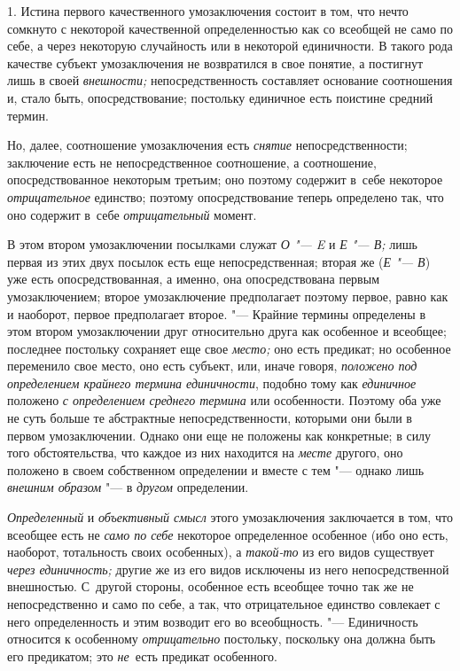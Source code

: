 1. Истина первого качественного умозаключения состоит в том,
что нечто сомкнуто с некоторой качественной определенностью как со всеобщей
не само по себе, а через некоторую случайность или в некоторой единичности.
В такого рода качестве субъект умозаключения не возвратился в свое понятие,
а постигнут лишь в своей {\em внешности;}
непосредственность составляет основание соотношения и, стало
быть, опосредствование; постольку единичное есть поистине средний термин.

Но, далее, соотношение умозаключения есть {\em снятие}
непосредственности; заключение есть не непосредственное
соотношение, а соотношение, опосредствованное некоторым третьим; оно
поэтому содержит в~себе некоторое {\em отрицательное}
единство; поэтому опосредствование теперь определено так, что
оно содержит в~себе {\em отрицательный} момент.

В этом втором умозаключении посылками служат {\em О "--- E} и {\em Е "--- В;}
лишь первая из этих двух посылок есть еще непосредственная; вторая же
({\em Е "--- В}) уже есть опосредствованная, а именно, она опосредствована
первым умозаключением; второе умозаключение предполагает поэтому первое,
равно как и наоборот, первое предполагает второе. "--- Крайние
термины определены в этом втором умозаключении друг относительно друга как
особенное и всеобщее; последнее постольку сохраняет еще свое {\em место;}
оно есть предикат; но особенное переменило свое место, оно есть субъект,
или, иначе говоря, {\em положено под определением
крайнего термина единичности}, подобно тому как
{\em единичное} положено {\em с определением среднего термина}
или особенности. Поэтому оба уже не суть больше те
абстрактные непосредственности, которыми они были в первом умозаключении.
Однако они еще не положены как конкретные; в силу того обстоятельства, что
каждое из них находится на {\em месте} другого, оно положено в своем
собственном определении и вместе с тем "--- однако лишь
{\em внешним образом} "--- в {\em другом} определении.

{\em Определенный} и {\em объективный смысл}
этого умозаключения заключается в том, что всеобщее есть не
{\em само по себе} некоторое определенное особенное (ибо оно есть, наоборот,
тотальность своих особенных), а {\em такой-то} из его видов существует
{\em через единичность;} другие же из его видов исключены из него
непосредственной внешностью. С~другой стороны, особенное есть всеобщее
точно так же не непосредственно и само по себе, а так, что отрицательное
единство совлекает с него определенность и этим возводит его во
всеобщность. "--- Единичность относится к особенному {\em отрицательно}
постольку, поскольку она должна быть его предикатом; это
{\em не}~есть предикат особенного.

